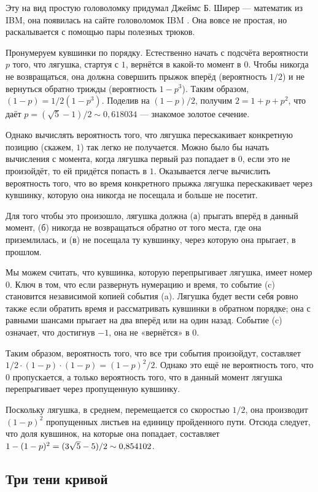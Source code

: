 Эту на вид простую головоломку придумал Джеймс Б. Ширер --- математик из IBM,
она появилась на сайте головоломок IBM \cite[апрель 2007]{ponder-this}.
Она вовсе не простая, но раскалывается с помощью пары полезных трюков.

Пронумеруем кувшинки по порядку.
Естественно начать с подсчёта вероятности $p$ того, что лягушка, стартуя с $1$, вернётся в какой-то момент в $0$.
Чтобы никогда не возвращаться, она должна совершить прыжок вперёд (вероятность $1/2$) и не вернуться обратно трижды (вероятность $1 - p^3$).
Таким образом, $(1 - p) = 1/2(1 - p^3)$.
Поделив на $(1 - p)/2$, получим $2 = 1 + p + p^2$, что даёт $p = (\sqrt5 - 1)/2 \sim 0{,}618034$ --- знакомое золотое сечение.

Однако вычислять вероятность того, что лягушка перескакивает конкретную позицию (скажем, $1$) так легко не получается.
Можно было бы начать вычисления с момента, когда лягушка первый раз попадает в $0$, если это не произойдёт, то ей придётся попасть в $1$.
Оказывается легче вычислить вероятность того, что во время конкретного прыжка лягушка перескакивает через кувшинку, которую она никогда не посещала и больше не посетит.

Для того чтобы это произошло, лягушка должна
(а) прыгать вперёд в данный момент,
(б) никогда не возвращаться обратно от того места, где она приземлилась,
и (в) не посещала ту кувшинку, через которую она прыгает, в прошлом.

Мы можем считать, что кувшинка, которую перепрыгивает лягушка, имеет номер 0.
Ключ в том, что если развернуть нумерацию и время, то событие (c) становится независимой копией события (a).
Лягушка будет вести себя ровно также если обратить время и рассматривать кувшинки в обратном порядке;
она с равными шансами прыгает на два вперёд или на один назад.
Событие (c) означает, что достигнув $-1$, она не «вернётся» в $0$.

Таким образом, вероятность того, что все три события произойдут, составляет $1/2 \cdot (1 - p) \cdot (1 - p) = (1 - p)^2 / 2$.
Однако это ещё не вероятность того, что $0$ пропускается, а только вероятность того, что в данный момент лягушка перепрыгивает через пропущенную кувшинку.

Поскольку лягушка, в среднем, перемещается со скоростью $1/2$, она производит $(1 - p)^2$ пропущенных листьев на единицу пройденного пути.
Отсюда следует, что доля кувшинок, на которые она попадает, составляет $1 - (1 - p)^2 \z= (3\sqrt5 - 5) / 2 \sim 0{,}854102$.

\subsection*{Три тени кривой}

